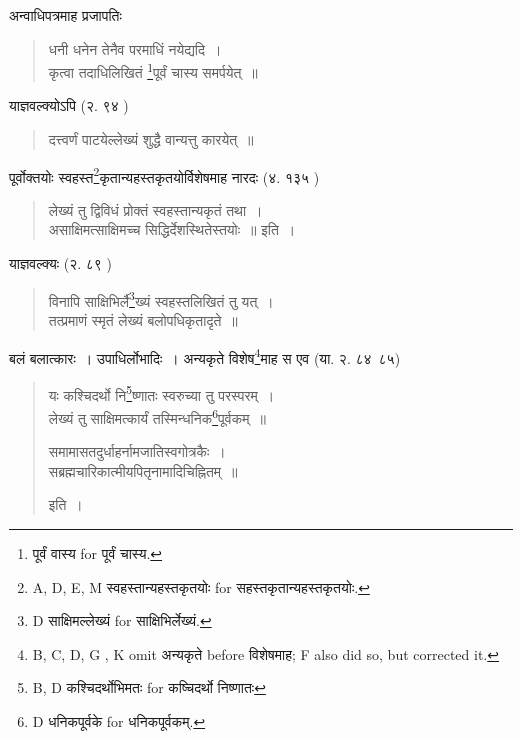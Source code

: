 \documentclass[11pt, openany]{book}
\begin{document}
अन्वाधिपत्रमाह प्रजापतिः 

\begin{quote}
{\vy धनी धनेन तेनैव परमाधिं नयेद्यदि~।\\
कृत्वा तदाधिलिखितं \renewcommand{\thefootnote}{1}\footnote{पूर्वं वास्य for पूर्वं चास्य.}पूर्वं चास्य समर्पयेत्~॥}
\end{quote}

याज्ञवल्क्योऽपि (२. ९४ )

\begin{quote}
{\vy दत्त्वर्णं पाटयेल्लेख्यं शुद्धै वान्यत्तु कारयेत्~॥}
\end{quote}

पूर्वोक्तयोः स्वहस्त\renewcommand{\thefootnote}{2}\footnote{A, D, E, M स्वहस्तान्यहस्तकृतयोः for सहस्तकृतान्यहस्तकृतयोः.}कृतान्यहस्तकृतयोर्विशेषमाह नारदः (४. १३५ )

\begin{quote}
{\vy लेख्यं तु द्विविधं प्रोक्तं स्वहस्तान्यकृतं तथा~।\\
असाक्षिमत्साक्षिमच्च सिद्धिर्देशस्थितेस्तयोः~॥} इति~।
\end{quote}

याज्ञवल्क्यः (२. ८९ ) 

\begin{quote}
{\vy विनापि साक्षिभिर्लै\renewcommand{\thefootnote}{3}\footnote{D साक्षिमल्लेख्यं for साक्षिभिर्लेख्यं.}ख्यं स्वहस्तलिखितं तु यत्~।\\
तत्प्रमाणं स्मृतं लेख्यं बलोपधिकृतादृते~॥}
\end{quote}

बलं बलात्कारः~। उपाधिर्लोभादिः~। अन्यकृते विशेष\renewcommand{\thefootnote}{4}\footnote{B, C, D, G , K omit अन्यकृते before विशेषमाह; F also did so, but corrected it.}माह स एव (या. २. ८४\textendash\ ८५)

\begin{quote}
{\vy यः कश्चिदर्थो नि\renewcommand{\thefootnote}{5}\footnote{B, D कश्चिदर्थोभिमतः for कष्चिदर्थो निष्णातः}ष्णातः स्वरुच्या तु परस्परम्~।\\
लेख्यं तु साक्षिमत्कार्यं तस्मिन्धनिक\renewcommand{\thefootnote}{6}\footnote{D धनिकपूर्वके for धनिकपूर्वकम्.}पूर्वकम्~॥

समामासतदुर्धाहर्नामजातिस्वगोत्रकैः~।\\
सब्रह्मचारिकात्मीयपितृनामादिचिह्नितम्~॥} इति~।
\end{quote}

\newpage
{}
\end{document}
